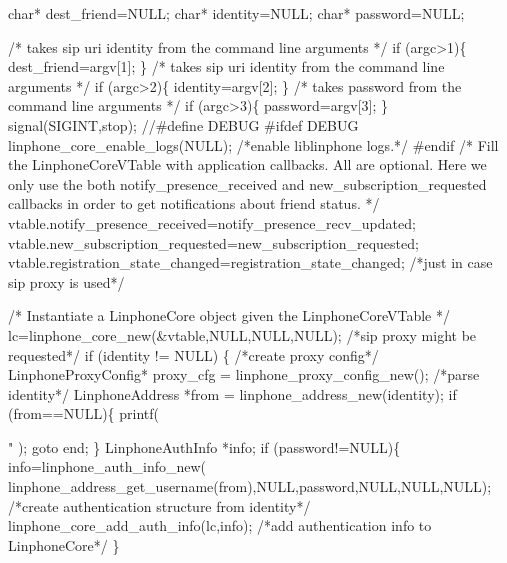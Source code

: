 \begin{DoxyCodeInclude}
{{{        \textcolor{keywordtype}{char}* dest\_friend=NULL;
        \textcolor{keywordtype}{char}* identity=NULL;
        \textcolor{keywordtype}{char}* password=NULL;

        \textcolor{comment}{/* takes   sip uri  identity from the command line arguments */}
        \textcolor{keywordflow}{if} (argc>1)\{
                dest\_friend=argv[1];
        \}
        \textcolor{comment}{/* takes   sip uri  identity from the command line arguments */}
        \textcolor{keywordflow}{if} (argc>2)\{
                identity=argv[2];
        \}
        \textcolor{comment}{/* takes   password from the command line arguments */}
        \textcolor{keywordflow}{if} (argc>3)\{
                password=argv[3];
        \}
        signal(SIGINT,stop);
\textcolor{comment}{//#define DEBUG}
\textcolor{preprocessor}{#ifdef DEBUG}
\textcolor{preprocessor}{}        linphone_core_enable_logs(NULL); \textcolor{comment}{/*enable liblinphone logs.*/}
\textcolor{preprocessor}{#endif}
\textcolor{preprocessor}{}        \textcolor{comment}{/* }
\textcolor{comment}{         Fill the LinphoneCoreVTable with application callbacks.}
\textcolor{comment}{         All are optional. Here we only use the both notify\_presence\_received and
       new\_subscription\_requested callbacks}
\textcolor{comment}{         in order to get notifications about friend status.}
\textcolor{comment}{         */}
        vtable.notify_presence_received=notify\_presence\_recv\_updated;
        vtable.new_subscription_requested=new\_subscription\_requested;
        vtable.registration_state_changed=registration\_state\_changed; \textcolor{comment}{/*just in case sip proxy is used*/}

        \textcolor{comment}{/*}
\textcolor{comment}{         Instantiate a LinphoneCore object given the LinphoneCoreVTable}
\textcolor{comment}{        */}
        lc=linphone_core_new(&vtable,NULL,NULL,NULL);
        \textcolor{comment}{/*sip proxy might be requested*/}
        \textcolor{keywordflow}{if} (identity != NULL)  \{
                \textcolor{comment}{/*create proxy config*/}
                LinphoneProxyConfig* proxy\_cfg = linphone_proxy_config_new();
                \textcolor{comment}{/*parse identity*/}
                LinphoneAddress *from = linphone_address_new(identity);
                \textcolor{keywordflow}{if} (from==NULL)\{
                        printf(\textcolor{stringliteral}{"%
      );
                        \textcolor{keywordflow}{goto} end;
                \}
                LinphoneAuthInfo *info;
                \textcolor{keywordflow}{if} (password!=NULL)\{
                        info=linphone_auth_info_new(
      linphone_address_get_username(from),NULL,password,NULL,NULL,NULL); \textcolor{comment}{/*create authentication structure from
       identity*/}
                        linphone_core_add_auth_info(lc,info); \textcolor{comment}{/*add authentication info to LinphoneCore*/}
                \}

}}}}
\end{DoxyCodeInclude}
